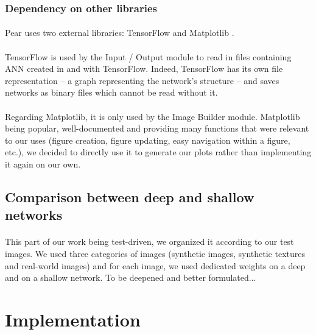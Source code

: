 \documentclass[a4paper]{article}
\begin{document}
\subsubsection{Dependency on other libraries}
\paragraph{}Pear uses two external libraries: TensorFlow \citep{tensorflow2015-whitepaper} and Matplotlib \citep{Hunter:2007}. 

\paragraph{}TensorFlow is used by the Input / Output module to read in files containing ANN created in and with TensorFlow. Indeed, TensorFlow has its own file representation -- a graph representing the network's structure -- and saves networks as binary files which cannot be read without it. 

\paragraph{}Regarding Matplotlib, it is only used by the Image Builder module. Matplotlib being popular, well-documented and providing many functions that were relevant to our uses (figure creation, figure updating, easy navigation within a figure, etc.), we decided to directly use it to generate our plots rather than implementing it again on our own. 


\subsection{Comparison between deep and shallow networks}
\paragraph{}This part of our work being test-driven, we organized it according to our test images. We used three categories of images (synthetic images, synthetic textures and real-world images) and for each image, we used dedicated weights on a deep and on a shallow network. To be deepened and better formulated...


\section{Implementation}
\end{document}
